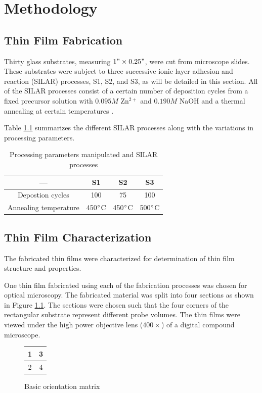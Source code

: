 \chapter{Methodology}
\section{Thin Film Fabrication}
Thirty glass substrates, measuring $1"\times0.25"$, were cut from microscope slides.
These substrates were subject to three successive ionic layer adhesion and reaction (SILAR) processes, S1, S2, and S3, as will be detailed in this section.
All of the SILAR processes consist of a certain number of deposition cycles from a fixed precursor solution with $0.095M$ Zn$^{2+}$ and $0.190M$ NaOH and a thermal annealing at certain temperatures \cite{florido17, gao08}.

Table \ref{tab:processes} summarizes the different SILAR processes along with the variations in processing parameters.

\begin{table}
  \caption{Processing parameters manipulated and SILAR processes}
  \centering
  \begin{tabular}{c c c c}
    \hline\hline
    --- & S1 & S2 & S3 \\
    \hline
    Depostion cycles & 100 & 75 & 100 \\
    Annealing temperature & 450$^{\circ}$C & 450$^{\circ}$C & 500$^{\circ}$C \\[1ex]
    \hline
  \end{tabular}
  \label{tab:processes}
\end{table}

\section{Thin Film Characterization}
The fabricated thin films were characterized for determination of thin film structure and properties.

One thin film fabricated using each of the fabrication processes was chosen for optical microscopy.
The fabricated material was split into four sections as shown in Figure \ref{fig:orient}.
The sections were chosen such that the four corners of the rectangular substrate represent different probe volumes.
The thin films were viewed under the high power objective lens ($400\times$) of a digital compound microscope.

\begin{figure}
  \centering
  \begin{tabular}{| c | c |}
    \hline
    1 & 3 \\
    \hline
    2 & 4 \\[0.5ex]
    \hline
  \end{tabular}
  \caption{Basic orientation matrix}
  \label{fig:orient}
\end{figure}

